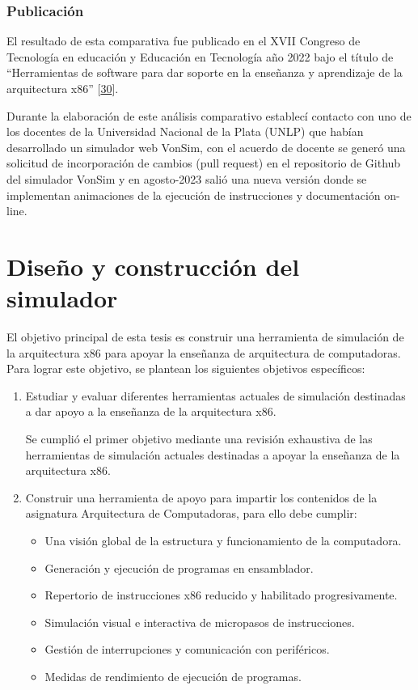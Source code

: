 \documentclass[12pt,twoside]{templates/unerthesis}
\providecommand{\tightlist}{%
  \setlength{\itemsep}{0pt}\setlength{\parskip}{0pt}}
\begin{document}
\hypertarget{publicaciuxf3n}{%
\subsection{Publicación}\label{publicaciuxf3n}}

El resultado de esta comparativa fue publicado en el XVII Congreso de Tecnología en educación y Educación en Tecnología año 2022 bajo el título de ``Herramientas de software para dar soporte en la enseñanza y aprendizaje de la arquitectura x86'' {[}\protect\hyperlink{ref-colombani_herramientas_2022}{30}{]}.

Durante la elaboración de este análisis comparativo establecí contacto con uno de los docentes de la Universidad Nacional de la Plata (UNLP) que habían desarrollado un simulador web VonSim, con el acuerdo de docente se generó una solicitud de incorporación de cambios (pull request) en el repositorio de Github del simulador VonSim y en agosto-2023 salió una nueva versión donde se implementan animaciones de la ejecución de instrucciones y documentación on-line.

\hypertarget{diseuxf1o-y-construcciuxf3n-del-simulador}{%
\chapter{Diseño y construcción del simulador}\label{diseuxf1o-y-construcciuxf3n-del-simulador}}

El objetivo principal de esta tesis es construir una herramienta de simulación de la arquitectura x86 para apoyar la enseñanza de arquitectura de computadoras. Para lograr este objetivo, se plantean los siguientes objetivos específicos:

\begin{enumerate}
\def\labelenumi{\arabic{enumi}.}
\item
  Estudiar y evaluar diferentes herramientas actuales de simulación destinadas a dar apoyo a la enseñanza de la arquitectura x86.

  Se cumplió el primer objetivo mediante una revisión exhaustiva de las herramientas de simulación actuales destinadas a apoyar la enseñanza de la arquitectura x86.
\item
  Construir una herramienta de apoyo para impartir los contenidos de la asignatura Arquitectura de Computadoras, para ello debe cumplir:

  \begin{itemize}
  \tightlist
  \item
    Una visión global de la estructura y funcionamiento de la computadora.
  \item
    Generación y ejecución de programas en ensamblador.
  \item
    Repertorio de instrucciones x86 reducido y habilitado progresivamente.
  \item
    Simulación visual e interactiva de micropasos de instrucciones.
  \item
    Gestión de interrupciones y comunicación con periféricos.
  \item
    Medidas de rendimiento de ejecución de programas.
  \end{itemize}
\end{enumerate}
\end{document}
